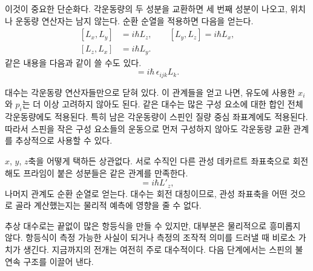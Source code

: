 이것이 중요한 단순화다. 각운동량의 두 성분을 교환하면 세 번째 성분이 나오고, 위치나 운동량 연산자는 남지 않는다. 순환 순열을 적용하면 다음을 얻는다.\begin{equation}
\begin{aligned}
[L_x,L_y]&=i\hbar L_z,\qquad
[L_y,L_z]=i\hbar L_x,\\
[L_z,L_x]&=i\hbar L_y.
\end{aligned}
\end{equation}같은 내용을 다음과 같이 쓸 수도 있다.\begin{equation}
[L_i,L_j]=i\hbar\,\epsilon_{ijk}L_k.
\end{equation}

대수는 각운동량 연산자들만으로 닫혀 있다. 이 관계들을 얻고 나면, 유도에 사용한 \(x_i\)와 \(p_i\)는 더 이상 고려하지 않아도 된다. 같은 대수는 많은 구성 요소에 대한 합인 전체 각운동량에도 적용된다. 특히 남은 각운동량이 스핀인 질량 중심 좌표계에도 적용된다. 따라서 스핀을 작은 구성 요소들의 운동으로 먼저 구성하지 않아도 각운동량 교환 관계를 추상적으로 사용할 수 있다.

\(x\), \(y\), \(z\)축을 어떻게 택하든 상관없다. 서로 수직인 다른 관성 데카르트 좌표축으로 회전해도 프라임이 붙은 성분들은 같은 관계를 만족한다.\begin{equation}
[L'_x,L'_y]=i\hbar L'_z,
\end{equation}나머지 관계도 순환 순열로 얻는다. 대수는 회전 대칭이므로, 관성 좌표축을 어떤 것으로 골라 계산했는지는 물리적 예측에 영향을 줄 수 없다.

\begin{classroomqa}\end{classroomqa}

추상 대수로는 끝없이 많은 항등식을 만들 수 있지만, 대부분은 물리적으로 흥미롭지 않다. 항등식이 측정 가능한 사실이 되거나 측정의 조작적 의미를 드러낼 때 비로소 가치가 생긴다. 지금까지의 전개는 여전히 주로 대수적이다. 다음 단계에서는 스핀의 불연속 구조를 이끌어 낸다.

\begin{classroomqa}\end{classroomqa}

